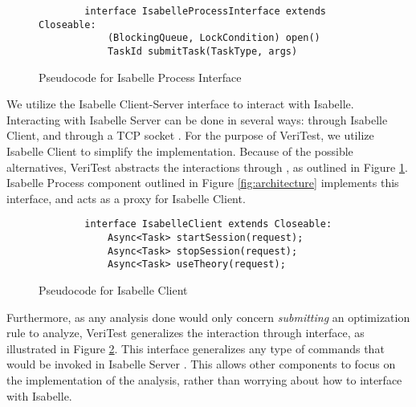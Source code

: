 \begin{figure}[!htb]
    \begin{lstlisting}
        interface IsabelleProcessInterface extends Closeable:
            (BlockingQueue, LockCondition) open()
            TaskId submitTask(TaskType, args)
    \end{lstlisting}

    \caption{Pseudocode for Isabelle Process Interface}
    \label{fig:IsabelleProcessInterface}
\end{figure}

We utilize the Isabelle Client-Server interface to interact with Isabelle. Interacting with Isabelle Server can be done in several ways: 
through Isabelle Client, and through a TCP socket \cite[Ch. 4]{isabelleSystem}. For the purpose of VeriTest, we utilize Isabelle Client to 
simplify the implementation. Because of the possible alternatives, VeriTest abstracts the interactions through , 
as outlined in Figure \ref{fig:IsabelleProcessInterface}. Isabelle Process component outlined in Figure \ref{fig:architecture} implements 
this interface, and acts as a proxy for Isabelle Client.

\begin{figure}[!htb]
    \begin{lstlisting}
        interface IsabelleClient extends Closeable:
            Async<Task> startSession(request);
            Async<Task> stopSession(request);
            Async<Task> useTheory(request);
    \end{lstlisting}

    \caption{Pseudocode for Isabelle Client}
    \label{fig:IsabelleClientInterface}
\end{figure}

Furthermore, as any analysis done would only concern \emph{submitting} an optimization rule to analyze, VeriTest generalizes the interaction 
through  interface, as illustrated in Figure \ref{fig:IsabelleClientInterface}. This interface generalizes any type of 
commands that would be invoked in Isabelle Server \cite[Sec. 4.4]{isabelleSystem}. This allows other components to focus on the implementation 
of the analysis, rather than worrying about how to interface with Isabelle.

